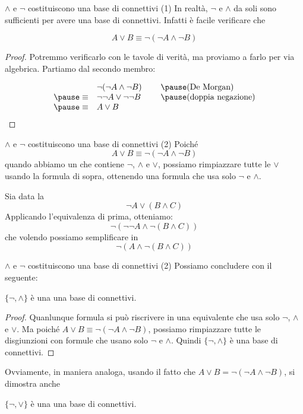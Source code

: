 \documentclass[aspectratio=169,10pt,dvipsnames,xcolor=table,handout]{beamer}
\begin{document}
\begin{frame}{$\wedge$ e $\neg$ costituiscono una base di connettivi (1)}
    In realtà, $\neg$ e $\wedge$ da soli sono sufficienti per avere una base di connettivi. Infatti è facile verificare che
    \begin{theorem}
    \[
        A \vee B \equiv \neg(\neg A \wedge \neg B)
    \]
    \end{theorem}
    \begin{proof}
    Potremmo verificarlo con le tavole di verità, ma proviamo a farlo per via algebrica. Partiamo dal secondo membro:

    \[
        \begin{array}{rl@{\hspace{0.8cm}}l}
                          & \neg(\neg A \wedge \neg B)& \pause \text{(De Morgan)} \\
            \pause \equiv & \neg \neg A \vee \neg \neg B  & \pause \text{(doppia negazione)}            \\
            \pause \equiv & A \vee B
        \end{array}
    \]
    \end{proof}
\end{frame}

\begin{frame}{$\wedge$ e $\neg$ costituiscono una base di connettivi (2)}
    Poiché
    \[A \vee B \equiv \neg(\neg A \wedge \neg B)\]
    quando abbiamo un \fp che contiene $\neg$, $\wedge$ e $\vee$, possiamo rimpiazzare tutte le $\vee$ usando la formula di sopra, ottenendo una formula che usa solo $\neg$ e $\wedge$.

    \begin{example}
        Sia data la \fp
        \[
            \neg A \vee (B \wedge C)
        \]
        Applicando l'equivalenza di prima, otteniamo:
        \pause
        \[
            \neg (\neg \neg A \wedge \neg (B \wedge C))
        \]
        che volendo possiamo semplificare in
        \pause
        \[
            \neg (A \wedge \neg (B \wedge C))
        \]
    \end{example}
\end{frame}

\begin{frame}{$\wedge$ e $\neg$ costituiscono una base di connettivi (2)}
    Possiamo concludere con il seguente:
    \begin{theorem}
        $\{ \neg, \wedge\}$ è una una base di connettivi.
    \end{theorem}
    \begin{proof}
        Quanlunque formula si può riscrivere in una equivalente che usa solo $\neg$, $\wedge$ e $\vee$. Ma poiché $A \vee B \equiv \neg(\neg A \wedge \neg B)$, possiamo rimpiazzare tutte le disgiunzioni con formule che usano solo $\neg$ e $\wedge$. Quindi $\{ \neg, \wedge\}$ è una base di connettivi.
    \end{proof}
    Ovviamente, in maniera analoga, usando il fatto che $A \vee B = \neg(\neg A \wedge \neg B)$, si dimostra anche
    \begin{theorem}
        $\{ \neg, \vee\}$ è una una base di connettivi.
    \end{theorem}
\end{frame}
\end{document}
